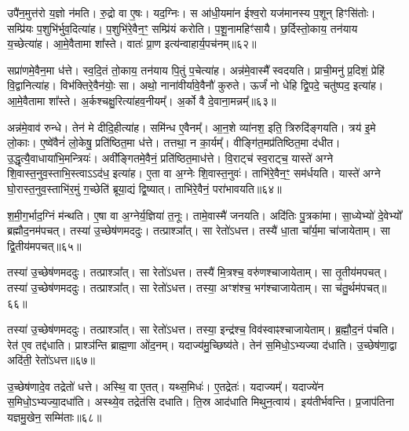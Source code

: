 उपै॑न॒मुत्त॑रो य॒ज्ञो न॑मति।
रु॒द्रो वा ए॒षः।
यद॒ग्निः।
स आ॑धी॒यमा॑न ईश्व॒रो यज॑मानस्य प॒शून् हिꣳसि॑तोः।
सम्प्रि॑यः प॒शुभि॑र्भुव॒दित्या॑ह।
प॒शुभि॑रे॒वैन॒ꣳ॒ सम्प्रि॑यं करोति।
प॒शू॒नामहिꣳ॑सायै।
छ॒र्दिस्तो॒काय॒ तन॑याय य॒च्छेत्या॑ह।
आ॒\-मे॒वैतामा शा᳚स्ते।
वातः॑ प्रा॒ण इत्य॑न्वाहार्य॒पच॑नम्॥६२॥\ip

सप्रा॑णमे॒वैन॒मा ध॑त्ते।
स्व॒दि॒तं तो॒काय॒ तन॑याय पि॒तुं प॒चेत्या॑ह।
अन्न॑मे॒वास्मै᳚ स्वदयति।
प्राची॒मनु॑ प्र॒दिशं॒ प्रेहि॑ वि॒द्वानित्या॑ह।
विभ॑क्तिरे॒वैन॑योः॒ सा।
अथो॒ नाना॑वीर्यावे॒वैनौ॑ कुरुते।
ऊर्जं॑ नो धेहि द्वि॒पदे॒ चतु॑ष्पद॒ इत्या॑ह।
आ॒\-मे॒वैतामा शा᳚स्ते।
अ॒र्कश्चक्षु॒रित्या॑हव॒नीयम्᳚।
अ॒र्को वै दे॒वाना॒मन्नम्᳚॥६३॥\ip

अन्न॑मे॒वाव॑ रुन्धे।
तेन॑ मे दीदि॒हीत्या॑ह।
समि॑न्ध ए॒वैनम्᳚।
आ॒न॒शे व्या॑नश॒ इति॒ त्रिरुदि॑ङ्गयति।
त्रय॑ इ॒मे लो॒काः।
ए॒ष्वे॑वैनं॑ लो॒केषु॒ प्रति॑\-ष्ठित॒मा ध॑त्ते।
तत्तथा॒ न का॒र्यम्᳚।
वीङ्गि॑त॒मप्र॑तिष्ठित॒मा द॑धीत।
उ॒द्धृत्यै॒वाधाया॑भि॒मन्त्रियः॑।
अवी᳚ङ्गितमे॒वैनं॒ प्रति॑\-ष्ठित॒माध॑त्ते।
वि॒राट्च॑ स्व॒राट्च॒ यास्ते॑ अग्ने शि॒वास्त॒नुव॒स्ताभि॒स्त्वा\-ऽऽद॑ध॒ इत्या॑ह।
ए॒ता वा अ॒ग्नेः शि॒वास्त॒नुवः॑।
ताभि॑रे॒वैन॒ꣳ॒ सम॑र्धयति।
यास्ते॑ अग्ने घो॒रास्त॒नुव॒स्ताभि॑र॒मुं ग॒च्छेति॑ ब्रूया॒द्यं द्वि॒ष्यात्।
ताभि॑रे॒वैनं॒ परा॑भावयति॥६४॥\ip\anuvakamend[लो॒को॑\-ऽ\-सृजतैन॒माध॑त्ते\-ऽन्वाहार्य॒पच॑नं दे॒वाना॒मन्न॑मेनं॒ प्रति॑\-ष्ठित॒माध॑त्ते॒ पञ्च॑ च]

श॒मी॒ग॒र्भाद॒ग्निं म॑न्थति।
ए॒षा वा अ॒ग्नेर्य॒ज्ञिया॑ त॒नूः।
तामे॒वास्मै॑ जनयति।
अदि॑तिः पु॒त्रका॑मा।
सा॒ध्येभ्यो॑ दे॒वेभ्यो᳚ ब्रह्मौद॒नम॑पचत्।
तस्या॑ उ॒च्छेष॑णमददुः।
तत्प्राश्ञा᳚त्।
सा रेतो॑\-ऽधत्त।
तस्यै॑ धा॒ता चा᳚र्य॒मा चा॑जाये\-ताम्।
सा द्वि॒तीय॑मपचत्॥६५॥\ip

तस्या॑ उ॒च्छेष॑णमददुः।
तत्प्राश्ञा᳚त्।
सा रेतो॑\-ऽधत्त।
तस्यै॑ मि॒त्रश्च॒ वरु॑णश्चाजाये\-ताम्।
सा तृ॒तीय॑मपचत्।
तस्या॑ उ॒च्छेष॑णमददुः।
तत्प्राश्ञा᳚त्।
सा रेतो॑\-ऽधत्त।
तस्या॒ अꣳश॑श्च॒ भग॑श्चाजाये\-ताम्।
सा च॑तु॒र्थम॑पचत्॥६६॥\ip

तस्या॑ उ॒च्छेष॑णमददुः।
तत्प्राश्ञा᳚त्।
सा रेतो॑\-ऽधत्त।
तस्या॒ इन्द्र॑श्च॒ विव॑स्वाꣴश्चाजाये\-ताम्।
ब्र॒ह्मौ॒द॒नं प॑चति।
रेत॑ ए॒व तद्द॑धाति।
प्राश्ञ॑न्ति ब्राह्म॒णा ओ॑द॒नम्।
यदाज्य॑मु॒च्छिष्य॑ते।
तेन॑ स॒मिधो॒\-ऽभ्यज्या द॑धाति।
उ॒च्छेष॑णा॒द्वा अदि॑ती॒ रेतो॑\-ऽधत्त॥६७॥\ip

उ॒च्छेष॑णादे॒व तद्रेतो॑ धत्ते।
अस्थि॒ वा ए॒तत्।
यथ्स॒मिधः॑।
ए॒तद्रेतः॑।
यदाज्यम्᳚।
यदाज्ये॑न स॒मिधो॒\-ऽभ्यज्या॒दधा॑ति।
अस्थ्ये॒व तद्रेत॑सि दधाति।
ति॒स्र आद॑धाति मिथुन॒त्वाय॑।
इय॑तीर्भवन्ति।
प्र॒जा\-प॑तिना यज्ञमु॒खेन॒ सम्मि॑ताः॥६८॥\ip

